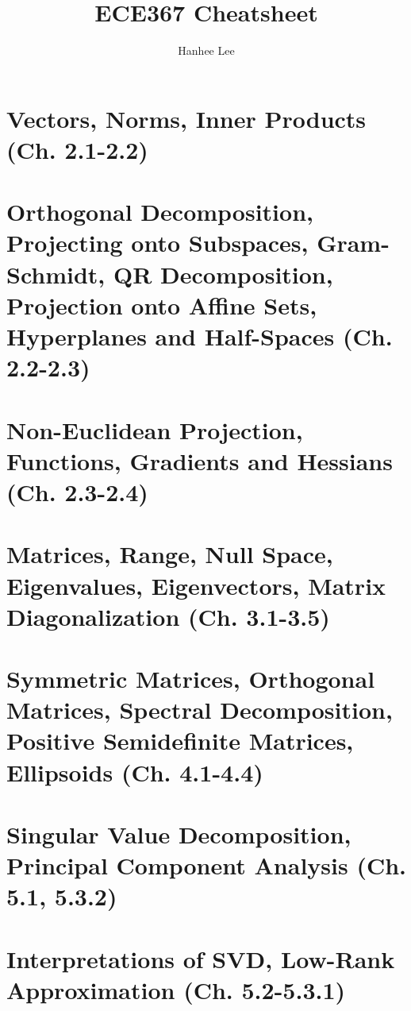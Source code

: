 \documentclass{article}
\title{ECE367 Cheatsheet}
\author{Hanhee Lee}
\begin{document}
\maketitle

\tableofcontents

\listoffigures

\listoftables

\section{Vectors, Norms, Inner Products (Ch. 2.1-2.2)}


\section{Orthogonal Decomposition, Projecting onto Subspaces, Gram-Schmidt, QR Decomposition, Projection onto Affine Sets, Hyperplanes and Half-Spaces (Ch. 2.2-2.3)}


\section{Non-Euclidean Projection, Functions, Gradients and Hessians (Ch. 2.3-2.4)}


\section{Matrices, Range, Null Space, Eigenvalues, Eigenvectors, Matrix Diagonalization (Ch. 3.1-3.5)}


\section{Symmetric Matrices, Orthogonal Matrices, Spectral Decomposition, Positive Semidefinite Matrices, Ellipsoids (Ch. 4.1-4.4)}


\section{Singular Value Decomposition, Principal Component Analysis (Ch. 5.1, 5.3.2)}


\section{Interpretations of SVD, Low-Rank Approximation (Ch. 5.2-5.3.1)}

\end{document}
